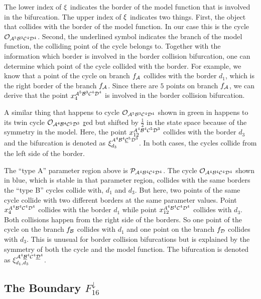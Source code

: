 The lower index of $\xi$ indicates the border of the model function that is involved in the bifurcation.
The upper index of $\xi$ indicates two things.
First, the object that collides with the border of the model function.
In our case this is the cycle $\mathcal{O}_{\mathcal{A}^5\mathcal{B}^3\mathcal{C}^4\mathcal{D}^4}$.
Second, the underlined symbol indicates the branch of the model function, the colliding point of the cycle belongs to.
Together with the information which border is involved in the border collision bifurcation, one can determine which point of the cycle collided with the border.
For example, we know that a point of the cycle on branch $f_{\mathcal{A}}$ collides with the border $d_1$, which is the right border of the branch $f_{\mathcal{A}}$.
Since there are $5$ points on branch $f_{\mathcal{A}}$, we can derive that the point $x_4^{\mathcal{A}^5\mathcal{B}^3\mathcal{C}^4\mathcal{D}^4}$ is involved in the border collision bifurcation.

A similar thing that happens to cycle $\mathcal{O}_{\mathcal{A}^5\mathcal{B}^3\mathcal{C}^4\mathcal{D}^4}$ shown in green in  happens to its twin cycle $\mathcal{O}_{\mathcal{A}^4\mathcal{B}^4\mathcal{C}^5\mathcal{D}^3}$ \href{shown in} red but shifted by $\frac{1}{2}$ in the state space because of the symmetry in the model.
Here, the point $x_{12}^{A^4\mathcal{B}^4\mathcal{C}^5\mathcal{D}^3}$ collides with the border $d_3$ and the bifurcation is denoted as $\xi_{d_3}^{A^4\mathcal{B}^4\underline{\mathcal{C}}^5\mathcal{D}^3}$.
In both cases, the cycles collide from the left side of the border.

The ``type A'' parameter region above is $\mathcal{P}_{\mathcal{A}^4\mathcal{B}^4\mathcal{C}^4\mathcal{D}^4}$.
The cycle $\mathcal{O}_{\mathcal{A}^4\mathcal{B}^4\mathcal{C}^4\mathcal{D}^4}$ shown in blue, which is stable in that parameter region, collides with the same borders the ``type B'' cycles collide with, $d_1$ and $d_3$.
But here, two points of the same cycle collide with two different borders at the same parameter values.
Point $x_{4}^{A^4\mathcal{B}^4\mathcal{C}^4\mathcal{D}^4}$ collides with the border $d_1$ while point $x_{12}^{A^4\mathcal{B}^4\mathcal{C}^4\mathcal{D}^4}$ collides with $d_3$.
Both collisions happen from the right side of the borders.
So one point of the cycle on the branch $f_{\mathcal{B}}$ collides with $d_1$ and one point on the branch $f_{\mathcal{D}}$ collides with $d_3$.
This is unusual for border collision bifurcations but is explained by the symmetry of both the cycle and the model function.
The bifurcation is denoted as $\xi_{d_1, d_3}^{\mathcal{A}^4\underline{\mathcal{B}}^4\mathcal{C}^4\underline{\mathcal{D}}^4}$.

\subsection{The Boundary $F_{16}^\downarrow$}
\label{sec:arch.bif.D}

